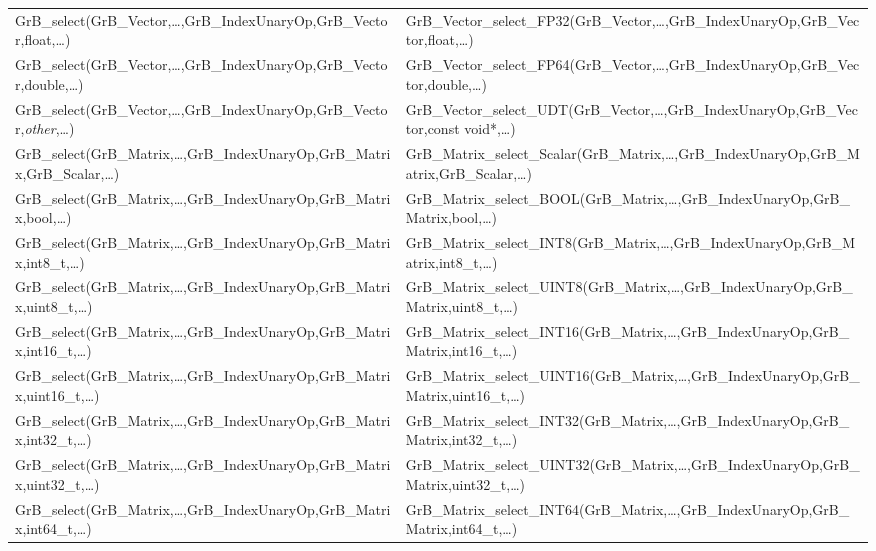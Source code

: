 \begin{landscape}
\begin{table}[htb]
{\begin{tabular}{l|l}
{\sf GrB\_select(GrB\_Vector,\ldots,GrB\_IndexUnaryOp,GrB\_Vector,float,\ldots)}		& {\sf GrB\_Vector\_select\_FP32(GrB\_Vector,\ldots,GrB\_IndexUnaryOp,GrB\_Vector,float,\ldots)} \\
{\sf GrB\_select(GrB\_Vector,\ldots,GrB\_IndexUnaryOp,GrB\_Vector,double,\ldots)}	    & {\sf GrB\_Vector\_select\_FP64(GrB\_Vector,\ldots,GrB\_IndexUnaryOp,GrB\_Vector,double,\ldots)} \\
{\sf GrB\_select(GrB\_Vector,\ldots,GrB\_IndexUnaryOp,GrB\_Vector,\emph{other},\ldots)}	& {\sf GrB\_Vector\_select\_UDT(GrB\_Vector,\ldots,GrB\_IndexUnaryOp,GrB\_Vector,const void*,\ldots)} \\
\hline

{\sf GrB\_select(GrB\_Matrix,\ldots,GrB\_IndexUnaryOp,GrB\_Matrix,GrB\_Scalar,\ldots)}	& {\sf GrB\_Matrix\_select\_Scalar(GrB\_Matrix,\ldots,GrB\_IndexUnaryOp,GrB\_Matrix,GrB\_Scalar,\ldots)} \\
{\sf GrB\_select(GrB\_Matrix,\ldots,GrB\_IndexUnaryOp,GrB\_Matrix,bool,\ldots)}	    & {\sf GrB\_Matrix\_select\_BOOL(GrB\_Matrix,\ldots,GrB\_IndexUnaryOp,GrB\_Matrix,bool,\ldots)} \\
{\sf GrB\_select(GrB\_Matrix,\ldots,GrB\_IndexUnaryOp,GrB\_Matrix,int8\_t,\ldots)}	    & {\sf GrB\_Matrix\_select\_INT8(GrB\_Matrix,\ldots,GrB\_IndexUnaryOp,GrB\_Matrix,int8\_t,\ldots)} \\
{\sf GrB\_select(GrB\_Matrix,\ldots,GrB\_IndexUnaryOp,GrB\_Matrix,uint8\_t,\ldots)}    & {\sf GrB\_Matrix\_select\_UINT8(GrB\_Matrix,\ldots,GrB\_IndexUnaryOp,GrB\_Matrix,uint8\_t,\ldots)} \\
{\sf GrB\_select(GrB\_Matrix,\ldots,GrB\_IndexUnaryOp,GrB\_Matrix,int16\_t,\ldots)}    & {\sf GrB\_Matrix\_select\_INT16(GrB\_Matrix,\ldots,GrB\_IndexUnaryOp,GrB\_Matrix,int16\_t,\ldots)} \\
{\sf GrB\_select(GrB\_Matrix,\ldots,GrB\_IndexUnaryOp,GrB\_Matrix,uint16\_t,\ldots)}	& {\sf GrB\_Matrix\_select\_UINT16(GrB\_Matrix,\ldots,GrB\_IndexUnaryOp,GrB\_Matrix,uint16\_t,\ldots)} \\
{\sf GrB\_select(GrB\_Matrix,\ldots,GrB\_IndexUnaryOp,GrB\_Matrix,int32\_t,\ldots)}    & {\sf GrB\_Matrix\_select\_INT32(GrB\_Matrix,\ldots,GrB\_IndexUnaryOp,GrB\_Matrix,int32\_t,\ldots)} \\
{\sf GrB\_select(GrB\_Matrix,\ldots,GrB\_IndexUnaryOp,GrB\_Matrix,uint32\_t,\ldots)}	& {\sf GrB\_Matrix\_select\_UINT32(GrB\_Matrix,\ldots,GrB\_IndexUnaryOp,GrB\_Matrix,uint32\_t,\ldots)} \\
{\sf GrB\_select(GrB\_Matrix,\ldots,GrB\_IndexUnaryOp,GrB\_Matrix,int64\_t,\ldots)}    & {\sf GrB\_Matrix\_select\_INT64(GrB\_Matrix,\ldots,GrB\_IndexUnaryOp,GrB\_Matrix,int64\_t,\ldots)} \\

\end{tabular}}
\end{table}
\end{landscape}
